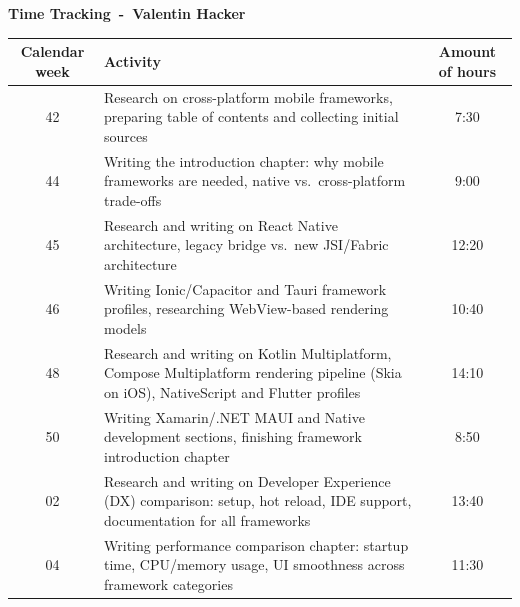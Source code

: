 \textbf{\huge Time Tracking~-~Valentin Hacker}

\begin{table}[H]
    \centering
    \begin{tabularx}{\textwidth}{|c|X|c|} %
        \hline %
        Calendar week & Activity                                                                                                                                              & Amount of hours \\
        \hline %
        42            & Research on cross-platform mobile frameworks, preparing table of contents and collecting initial sources                                                & 7:30            \\
        \hline %
        44            & Writing the introduction chapter: why mobile frameworks are needed, native vs.\ cross-platform trade-offs                                               & 9:00            \\
        \hline %
        45            & Research and writing on React Native architecture, legacy bridge vs.\ new JSI/Fabric architecture                                                       & 12:20           \\
        \hline %
        46            & Writing Ionic/Capacitor and Tauri framework profiles, researching WebView-based rendering models                                                        & 10:40           \\
        \hline %
        48            & Research and writing on Kotlin Multiplatform, Compose Multiplatform rendering pipeline (Skia on iOS), NativeScript and Flutter profiles                  & 14:10           \\
        \hline %
        50            & Writing Xamarin/.NET MAUI and Native development sections, finishing framework introduction chapter                                                      & 8:50            \\
        \hline %
        02            & Research and writing on Developer Experience (DX) comparison: setup, hot reload, IDE support, documentation for all frameworks                          & 13:40           \\
        \hline %
        04            & Writing performance comparison chapter: startup time, CPU/memory usage, UI smoothness across framework categories                                       & 11:30           \\

\end{tabularx}
\end{table}

